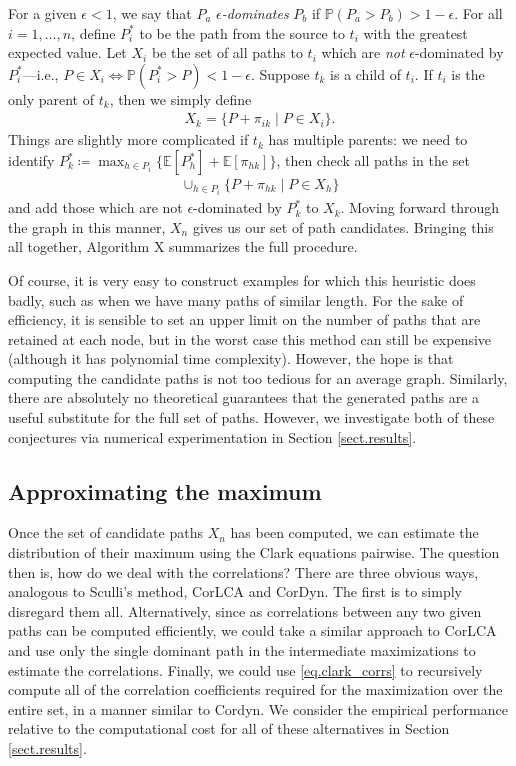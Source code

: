 \documentclass[12pt]{article}
\def\P{\mathbb{P}}
\def\E{\mathbb{E}}
\begin{document}
For a given $\epsilon < 1$, we say that $P_a$ {\em $\epsilon$-dominates} $P_b$ if $\P(P_a > P_b) > 1 - \epsilon$. For all $i = 1, \dots, n$, define $P_i^*$ to be the path from the source to $t_i$ with the greatest expected value. Let $X_i$ be the set of all paths to $t_i$ which are {\em not} $\epsilon$-dominated by $P_i^*$---i.e., $P \in X_i \iff \P(P_i^* > P) < 1- \epsilon$. Suppose $t_k$ is a child of $t_i$. If $t_i$ is the only parent of $t_k$, then we simply define
\begin{align*}
  X_k = \{P + \pi_{ik} \mid P \in X_i\}.
\end{align*}
Things are slightly more complicated if $t_k$ has multiple parents: we need to identify $P_k^* \coloneqq \max_{h \in P_i} \{ \E[P_h^*] + \E[\pi_{hk}] \}$, then check all paths in the set  
\begin{align*}
  \cup_{h \in P_i}\{P + \pi_{hk} \mid P \in X_h \}
\end{align*}
and add those which are not $\epsilon$-dominated by $P_k^*$ to $X_k$. Moving forward through the graph in this manner, $X_n$ gives us our set of path candidates. Bringing this all together, Algorithm X summarizes the full procedure.    
 
Of course, it is very easy to construct examples for which this heuristic does badly, such as when we have many paths of similar length. For the sake of efficiency, it is sensible to set an upper limit on the number of paths that are retained at each node, but in the worst case this method can still be expensive (although it has polynomial time complexity). However, the hope is that computing the candidate paths is not too tedious for an average graph. Similarly, there are absolutely no theoretical guarantees that the generated paths are a useful substitute for the full set of paths. However, we investigate both of these conjectures via numerical experimentation in Section \ref{sect.results}. 

\subsection{Approximating the maximum}
\label{subsect.approx_max}

Once the set of candidate paths $X_n$ has been computed, we can estimate the distribution of their maximum using the Clark equations pairwise. The question then is, how do we deal with the correlations? There are three obvious ways, analogous to Sculli's method, CorLCA and CorDyn. The first is to simply disregard them all. Alternatively, since as correlations between any two given paths can be computed efficiently, we could take a similar approach to CorLCA and use only the single dominant path in the intermediate maximizations to estimate the correlations. Finally, we could use \eqref{eq.clark_corrs} to recursively compute all of the correlation coefficients required for the maximization over the entire set, in a manner similar to Cordyn. We consider the empirical performance relative to the computational cost for all of these alternatives in Section \ref{sect.results}.  
\end{document}
